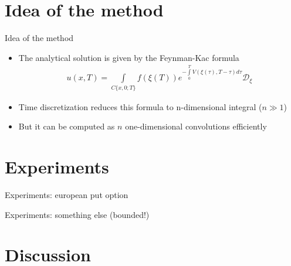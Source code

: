 \documentclass{beamer}
\theoremstyle{definition}
\theoremstyle{plain}
\theoremstyle{remark}
\begin{document}
	\section{Idea of the method}
		\begin{frame}{Idea of the method}
            \begin{itemize}
                \item The analytical solution is given by the Feynman-Kac formula
                \begin{equation}
                    \begin{aligned}
                    \nonumber
                    u(x, T) = \int\limits_{C\{x,0; T\}} f(\xi(T)) e^{-\int\limits_0^T V(\xi(\tau), T - \tau) d\tau} \mathcal D_\xi
                    \end{aligned}
                \end{equation} 
                \pause
                \item Time discretization reduces this formula to n-dimensional integral ($n \gg 1$)
                \pause
                \item But it can be computed as $n$ one-dimensional convolutions efficiently  
            \end{itemize}		
		\end{frame}
		

	\section{Experiments}
		\begin{frame}{Experiments: european put option}
		
		\end{frame}

		\begin{frame}{Experiments: something else (bounded!)}
		
		\end{frame}

	\section{Discussion}
\end{document}

